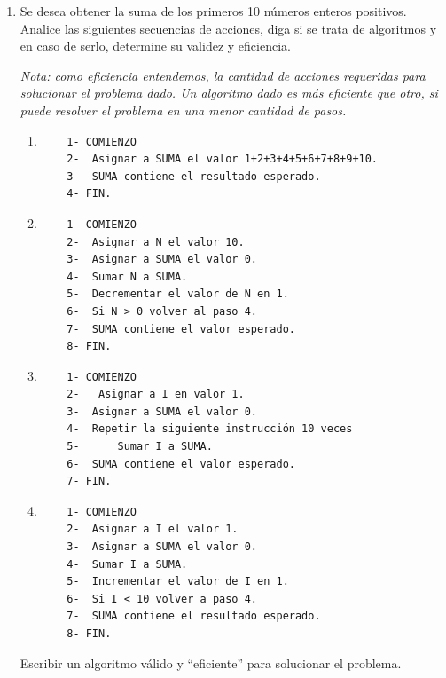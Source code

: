 \documentclass[a4paper,10pt]{article}
\begin{document}
\begin{enumerate}
\item Se desea obtener la suma de los primeros 10 n\'umeros enteros positivos. Analice las siguientes secuencias de acciones, diga si se trata de algoritmos y en caso de serlo, determine su validez y eficiencia.\\
\begin{small} \emph{Nota: como eficiencia entendemos, la cantidad de acciones requeridas para solucionar el problema dado. Un algoritmo dado es m\'as eficiente que otro, si puede resolver el problema en una menor cantidad de pasos.} \end{small}
\begin{small}
\begin{enumerate}
    \item[a-]
\begin{verbatim}
	1- COMIENZO
	2- 	Asignar a SUMA el valor 1+2+3+4+5+6+7+8+9+10.
	3- 	SUMA contiene el resultado esperado.
	4- FIN.
\end{verbatim}
    \item[b-]
\begin{verbatim}
	1- COMIENZO
	2- 	Asignar a N el valor 10.
	3- 	Asignar a SUMA el valor 0.
	4- 	Sumar N a SUMA.
	5- 	Decrementar el valor de N en 1.
	6- 	Si N > 0 volver al paso 4.
	7- 	SUMA contiene el valor esperado.
	8- FIN.
\end{verbatim}
    \item[c-]
\begin{verbatim}
	1- COMIENZO
	2- 	 Asignar a I en valor 1.
	3- 	Asignar a SUMA el valor 0.
	4- 	Repetir la siguiente instrucción 10 veces
	5- 		Sumar I a SUMA.
	6- 	SUMA contiene el valor esperado.
	7- FIN.
\end{verbatim}
    \item[d-]
\begin{verbatim}
	1- COMIENZO
	2- 	Asignar a I el valor 1.
	3- 	Asignar a SUMA el valor 0.
	4- 	Sumar I a SUMA.
	5- 	Incrementar el valor de I en 1.
	6- 	Si I < 10 volver a paso 4.
	7- 	SUMA contiene el resultado esperado.
	8- FIN.
\end{verbatim}
\end{enumerate}
\end{small}

Escribir un algoritmo v\'alido y ``eficiente'' para solucionar el problema.


\end{enumerate}
\end{document}
